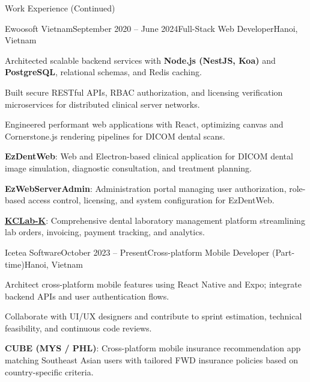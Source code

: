 \documentclass{resume}
\begin{document}
  \begin{rSection}{Work Experience (Continued)}
    \begin{rSubsection}{Ewoosoft Vietnam}{September 2020 -- June 2024}{Full-Stack Web Developer}{Hanoi, Vietnam}
      \item Architected scalable backend services with \textbf{Node.js (NestJS, Koa)} and \textbf{PostgreSQL}, relational schemas, and Redis caching.
      \item Built secure RESTful APIs, RBAC authorization, and licensing verification microservices for distributed clinical server networks.
      \item Engineered performant web applications with React, optimizing canvas and Cornerstone.js rendering pipelines for DICOM dental scans.
      \rProjectsHeader
      \item \textbf{EzDentWeb}: Web and Electron-based clinical application for DICOM dental image simulation, diagnostic consultation, and treatment planning.
      \item \textbf{EzWebServerAdmin}: Administration portal managing user authorization, role-based access control, licensing, and system configuration for EzDentWeb.
      \item \href{https://intro.kr.dentalcleverlab.com/}{\textbf{KCLab-K}}: Comprehensive dental laboratory management platform streamlining lab orders, invoicing, payment tracking, and analytics.
    \end{rSubsection}

    \begin{rSubsection}{Icetea Software}{October 2023 -- Present}{Cross-platform Mobile Developer (Part-time)}{Hanoi, Vietnam}
      \item Architect cross-platform mobile features using React Native and Expo; integrate backend APIs and user authentication flows.
      \item Collaborate with UI/UX designers and contribute to sprint estimation, technical feasibility, and continuous code reviews.
      \rProjectsHeader
      \item \textbf{CUBE (MYS / PHL)}: Cross-platform mobile insurance recommendation app matching Southeast Asian users with tailored FWD insurance policies based on country-specific criteria.
    \end{rSubsection}


\end{rSection}
\end{document}
